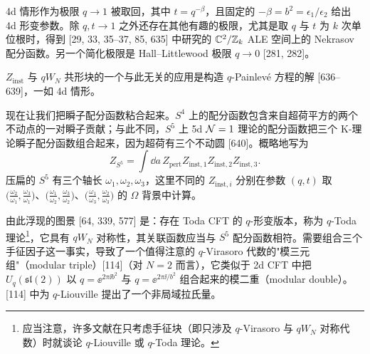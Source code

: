 4d 情形作为极限 $q\to 1$ 被取回，其中 $t=q^{-\beta}$，且固定的 $-\beta=b^2=\epsilon_1/\epsilon_2$ 给出 4d 形变参数。除 $q,t\to 1$ 之外还存在其他有趣的极限，尤其是取 $q$ 与 $t$ 为 $k$ 次单位根时，得到 [29, 33, 35--37, 85, 635] 中研究的 $\mathbb{C}^2/\mathbb{Z}_k$ ALE 空间上的 Nekrasov 配分函数。另一个简化极限是 Hall--Littlewood 极限 $q\to 0$ [281, 282]。

$Z_{\text{inst}}$ 与 $qW_N$ 共形块的一个与此无关的应用是构造 $q$-Painlevé 方程的解 [636--639]，一如 4d 情形。

现在让我们把瞬子配分函数粘合起来。$S^4$ 上的配分函数包含来自超荷平方的两个不动点的一对瞬子贡献；与此不同，$S^5$ 上 5d $\mathcal{N}=1$ 理论的配分函数把三个 K-理论瞬子配分函数组合起来，因为超荷有三个不动圆 [640]。概略地写为
\begin{equation}
Z_{S^5}=\int \dd a\, Z_{\text{pert}}Z_{\text{inst},1}Z_{\text{inst},2}Z_{\text{inst},3}.
\tag{9.1}
\end{equation}
压扁的 $S^5$ 有三个轴长 $\omega_1,\omega_2,\omega_3$，这里不同的 $Z_{\text{inst},i}$ 分别在参数 $(q,t)$ 取
$\big(\tfrac{\omega_2}{\omega_1},\tfrac{\omega_3}{\omega_1}\big)$、$\big(\tfrac{\omega_1}{\omega_2},\tfrac{\omega_3}{\omega_2}\big)$、$\big(\tfrac{\omega_1}{\omega_3},\tfrac{\omega_2}{\omega_3}\big)$ 的 $\Omega$ 背景中计算。

由此浮现的图景 [64, 339, 577] 是：存在 Toda CFT 的 $q$-形变版本，称为 $q$-Toda 理论\footnote{应当注意，许多文献在只考虑手征块（即只涉及 $q$-Virasoro 与 $qW_N$ 对称代数）时就谈论 $q$-Liouville 或 $q$-Toda 理论。}，它具有 $qW_N$ 对称性，其关联函数应当与 $S^5$ 配分函数相符。需要组合三个手征因子这一事实，导致了一个值得注意的 $q$-Virasoro 代数的"模三元组"（modular triple）[114]（对 $N=2$ 而言），它类似于 2d CFT 中把 $U_q(\mathfrak{sl}(2))$ 以 $q=\ee^{2\pi\ii b^2}$ 与 $q=\ee^{2\pi\ii/b^2}$ 组合起来的模二重（modular double）。[114] 中为 $q$-Liouville 提出了一个非局域拉氏量。

